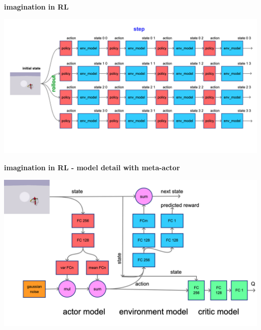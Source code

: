 \documentclass[xcolor=dvipsnames]{beamer}
\begin{document}
\begin{frame}{\bf imagination in RL}

  {\centering \includegraphics[scale=0.12]{../diagrams/imagination.png}}
\end{frame}

\begin{frame}{\bf imagination in RL - model detail with meta-actor}

  {\centering \includegraphics[scale=0.18]{../diagrams/imaginationmodeldetail.png}}
\end{frame}
\end{document}

